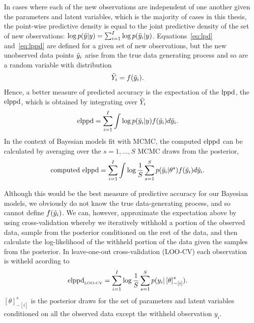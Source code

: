 In cases where each of the new observations are independent of one another given the parameters and latent variables, which is the majority of cases in this thesis, the point-wise predictive density is equal to the joint predictive density of the set of new observations: $\log p(\Tilde{y}|y) = {\sum}^I_{i = 1} \log p(\Tilde{y}_i|y)$. Equations~\eqref{eq:lpd} and~\eqref{eq:lppd} are defined for a given set of new observations, but the new unobserved data points $\Tilde{y}_i$ arise from the true data generating process and so are a random variable with distribution
\begin{equation} \label{ep:y_tild_dist}
 \Tilde{Y}_i = f(\Tilde{y}_i).
\end{equation}
Hence, a better measure of predicted accuracy is the expectation of the $\hbox{lppd}$, the $\hbox{elppd}$, which is obtained by integrating over $\Tilde{Y}_i$
\begin{equation} \label{ep:elppd}
 \hbox{elppd} = \sum^I_{i = 1} \int \log p(\Tilde{y}_i|y)f(\Tilde{y}_i) d\Tilde{y}_i.
\end{equation}
In the context of Bayesian models fit with MCMC, the computed $\hbox{elppd}$ can be calculated by averaging over the $s = 1, ..., S$ MCMC draws from the posterior,
\begin{equation} \label{ep:computed_elppd}
 \hbox{computed elppd} = \sum^I_{i = 1} \int \log \frac{1}{S} \sum^S_{s = 1} p(\Tilde{y}_i|\theta^s)f(\Tilde{y}_i) d\Tilde{y}_i.
\end{equation}

Although this would be the best measure of predictive accuracy for our Bayesian models, we obviously do not know the true data-generating process, and so cannot define $f(\Tilde{y}_i)$. We can, however, approximate the expectation above by using cross-validation whereby we iteratively withhold a portion of the observed data, sample from the posterior conditioned on the rest of the data, and then calculate the log-likelihood of the withheld portion of the data given the samples from the posterior. In leave-one-out cross-validation (LOO-CV) each observation is witheld acording to
\begin{equation} \label{eq:elppd_loo}
 \hbox{elppd}_{\text{\tiny{LOO-CV}}} = \sum^I_{i = 1} \log \frac{1}{S} \sum^S_{s = 1} p(y_i|\left[\theta\right]_{-\left[i\right]}^s).
\end{equation}
$\left[\theta\right]_{-\left[i\right]}^s$ is the posterior draws for the set of parameters and latent variables conditioned on all the observed data except the withheld observation $y_i$.


